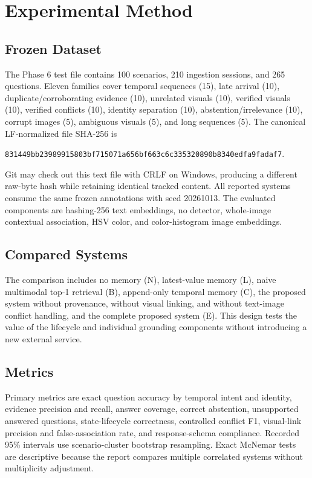 \documentclass[conference]{IEEEtran}
\begin{document}
\section{Experimental Method}
\subsection{Frozen Dataset}
The Phase 6 test file contains 100 scenarios, 210 ingestion sessions, and 265 questions. Eleven families cover temporal sequences (15), late arrival (10), duplicate/corroborating evidence (10), unrelated visuals (10), verified visuals (10), verified conflicts (10), identity separation (10), abstention/irrelevance (10), corrupt images (5), ambiguous visuals (5), and long sequences (5). The canonical LF-normalized file SHA-256 is
\begin{center}
\footnotesize\texttt{831449bb23989915803bf715071a656bf663c6c335320890b8340edfa9fadaf7}.
\end{center}
Git may check out this text file with CRLF on Windows, producing a different raw-byte hash while retaining identical tracked content. All reported systems consume the same frozen annotations with seed 20261013. The evaluated components are hashing-256 text embeddings, no detector, whole-image contextual association, HSV color, and color-histogram image embeddings.

\subsection{Compared Systems}
The comparison includes no memory (N), latest-value memory (L), naive multimodal top-1 retrieval (B), append-only temporal memory (C), the proposed system without provenance, without visual linking, and without text-image conflict handling, and the complete proposed system (E). This design tests the value of the lifecycle and individual grounding components without introducing a new external service.

\subsection{Metrics}
Primary metrics are exact question accuracy by temporal intent and identity, evidence precision and recall, answer coverage, correct abstention, unsupported answered questions, state-lifecycle correctness, controlled conflict F1, visual-link precision and false-association rate, and response-schema compliance. Recorded 95\% intervals use scenario-cluster bootstrap resampling. Exact McNemar tests are descriptive because the report compares multiple correlated systems without multiplicity adjustment.
\end{document}
